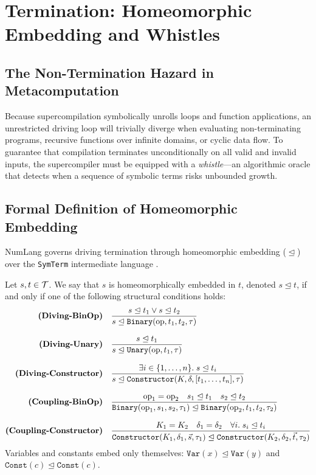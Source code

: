 \chapter{Termination: Homeomorphic Embedding and Whistles}
\label{chap:termination}

\section{The Non-Termination Hazard in Metacomputation}
\label{sec:termination:hazard}

Because supercompilation symbolically unrolls loops and function applications, an unrestricted driving loop will trivially diverge when evaluating non-terminating programs, recursive functions over infinite domains, or cyclic data flow. To guarantee that compilation terminates unconditionally on all valid and invalid inputs, the supercompiler must be equipped with a \emph{whistle}---an algorithmic oracle that detects when a sequence of symbolic terms risks unbounded growth.

\section{Formal Definition of Homeomorphic Embedding}
\label{sec:termination:he_def}

NumLang governs driving termination through homeomorphic embedding ($\trianglelefteq$) over the \texttt{SymTerm} intermediate language \citep{sorensen1995algorithm}.

\begin{definition}
Let $s, t \in \mathcal{T}$. We say that $s$ is homeomorphically embedded in $t$, denoted $s \trianglelefteq t$, if and only if one of the following structural conditions holds:
\begin{align}
\text{\bf (Diving-BinOp)} \quad & \frac{s \trianglelefteq t_1 \lor s \trianglelefteq t_2}{s \trianglelefteq \mathtt{Binary}(\text{op}, t_1, t_2, \tau)} \\[0.8em]
\text{\bf (Diving-Unary)} \quad & \frac{s \trianglelefteq t_1}{s \trianglelefteq \mathtt{Unary}(\text{op}, t_1, \tau)} \\[0.8em]
\text{\bf (Diving-Constructor)} \quad & \frac{\exists i \in \{1, \dots, n\}.\; s \trianglelefteq t_i}{s \trianglelefteq \mathtt{Constructor}(K, \delta, [t_1, \dots, t_n], \tau)} \\[0.8em]
\text{\bf (Coupling-BinOp)} \quad & \frac{\text{op}_1 = \text{op}_2 \quad s_1 \trianglelefteq t_1 \quad s_2 \trianglelefteq t_2}{\mathtt{Binary}(\text{op}_1, s_1, s_2, \tau_1) \trianglelefteq \mathtt{Binary}(\text{op}_2, t_1, t_2, \tau_2)} \\[0.8em]
\text{\bf (Coupling-Constructor)} \quad & \frac{K_1 = K_2 \quad \delta_1 = \delta_2 \quad \forall i.\; s_i \trianglelefteq t_i}{\mathtt{Constructor}(K_1, \delta_1, \vec{s}, \tau_1) \trianglelefteq \mathtt{Constructor}(K_2, \delta_2, \vec{t}, \tau_2)}
\end{align}
Variables and constants embed only themselves: $\mathtt{Var}(x) \trianglelefteq \mathtt{Var}(y)$ and $\mathtt{Const}(c) \trianglelefteq \mathtt{Const}(c)$.
\end{definition}

